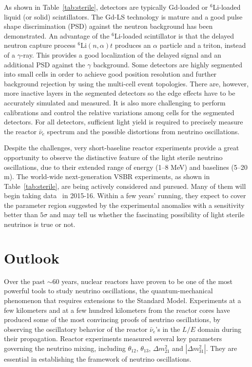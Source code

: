 \documentclass[aps,twocolumn,preprintnumbers,amsmath,superscriptaddress,amssymb,floats,nofootinbib]{revtex4-1}
\begin{document}
As shown in Table~\ref{tab:sterile}, detectors are typically Gd-loaded or $^{6}$Li-loaded liquid (or solid) scintillators.
The Gd-LS technology is mature and a good pulse shape discrimination (PSD) against the neutron background has been demonstrated.
An advantage of the $^{6}$Li-loaded scintillator is that the
delayed neutron capture process $^{6}$Li$(n,\alpha)t$ produces an $\alpha$ particle and a triton, instead of a $\gamma$-ray.
This provides a good localization of the delayed signal and an additional PSD against the $\gamma$ background.
Some detectors are highly segmented into small cells in order to achieve good position resolution and further background rejection by using the multi-cell event topologies.
There are, however, more inactive layers in the segmented detectors so the edge effects have to be accurately simulated and measured.
It is also more challenging to perform calibrations and control the relative variations among cells for the segmented detectors.
For all detectors, sufficient light yield is required to precisely measure the reactor $\bar\nu_e$ spectrum and the possible distortions from neutrino oscillations.


Despite the challenges, very short-baseline reactor experiments provide a great opportunity to observe the distinctive feature of the light sterile neutrino oscillations, due to their extended range of energy (1--8 MeV) and baselines (5--20 m).
The world-wide next-generation VSBR experiments, as shown in Table~\ref{tab:sterile}, are being actively considered and pursued.
Many of them will begin taking data~\cite{Lasserre-Neutrino14} in 2015-16. Within a few years' running, they expect to cover the parameter region
suggested by the experimental anomalies with a sensitivity better than $5\sigma$ and
may tell us whether the fascinating possibility of light sterile neutrinos is true or not.


\section{Outlook}
\label{sec:final}

Over the past $\sim$60 years, nuclear reactors have proven to be one of the most powerful tools to study neutrino oscillations, the quantum-mechanical phenomenon that requires extensions to the Standard Model. Experiments at a few kilometers and at a few hundred kilometers from the reactor cores have produced some of the most convincing proofs of neutrino oscillations, by observing the oscillatory behavior of the reactor $\bar\nu_e$'s in the $L/E$ domain during their propagation. Reactor experiments measured several key parameters governing the neutrino mixing, including $\theta_{12}$, $\theta_{13}$, $\Delta{m}^2_{21}$ and $|\Delta{m}^2_{31}|$. They are essential in establishing the framework of neutrino oscillations.
\end{document}
